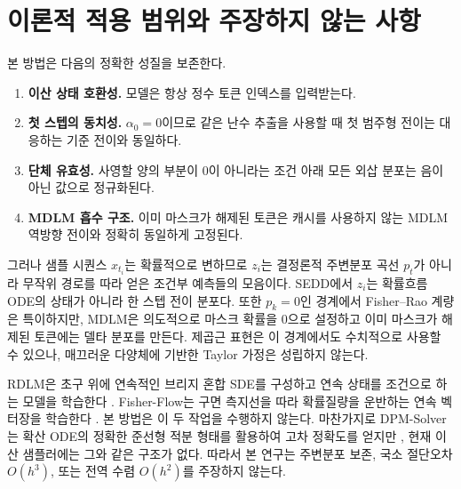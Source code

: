 \section{이론적 적용 범위와 주장하지 않는 사항}

본 방법은 다음의 정확한 성질을 보존한다.
\begin{enumerate}
  \item \textbf{이산 상태 호환성.} 모델은 항상 정수 토큰 인덱스를 입력받는다.
  \item \textbf{첫 스텝의 동치성.} $\alpha_0=0$이므로 같은 난수 추출을 사용할 때 첫 범주형 전이는
  대응하는 기준 전이와 동일하다.
  \item \textbf{단체 유효성.} 사영할 양의 부분이 0이 아니라는 조건 아래 모든 외삽 분포는 음이 아닌
  값으로 정규화된다.
  \item \textbf{MDLM 흡수 구조.} 이미 마스크가 해제된 토큰은 캐시를 사용하지 않는 MDLM 역방향
  전이와 정확히 동일하게 고정된다.
\end{enumerate}

그러나 샘플 시퀀스 $x_{t_i}$는 확률적으로 변하므로 $z_i$는 결정론적 주변분포 곡선 $p_t$가 아니라
무작위 경로를 따라 얻은 조건부 예측들의 모음이다. SEDD에서 $z_i$는 확률흐름 ODE의 상태가 아니라
한 스텝 전이 분포다. 또한 $p_k=0$인 경계에서 Fisher--Rao 계량은 특이하지만, MDLM은 의도적으로
마스크 확률을 0으로 설정하고 이미 마스크가 해제된 토큰에는 델타 분포를 만든다. 제곱근 표현은 이
경계에서도 수치적으로 사용할 수 있으나, 매끄러운 다양체에 기반한 Taylor 가정은 성립하지 않는다.

RDLM은 초구 위에 연속적인 브리지 혼합 SDE를 구성하고 연속 상태를 조건으로 하는 모델을 학습한다
\citep{jo2025rdlm}. Fisher-Flow는 구면 측지선을 따라 확률질량을 운반하는 연속 벡터장을 학습한다
\citep{davis2024fisherflow}. 본 방법은 이 두 작업을 수행하지 않는다. 마찬가지로 DPM-Solver는
확산 ODE의 정확한 준선형 적분 형태를 활용하여 고차 정확도를 얻지만 \citep{lu2022dpmsolver}, 현재
이산 샘플러에는 그와 같은 구조가 없다. 따라서 본 연구는 주변분포 보존, 국소 절단오차 $O(h^3)$,
또는 전역 수렴 $O(h^2)$를 주장하지 않는다.
